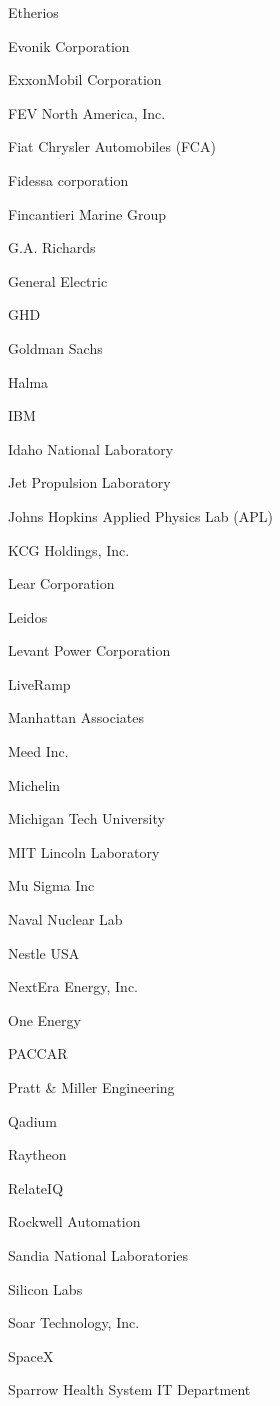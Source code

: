\documentclass[twoside]{article}
\begin{document}
\begin{center}
\begin{multicols}{5}
\begin{FlushLeft}
\begin{compactitem}
\item Etherios
\item Evonik Corporation
\item ExxonMobil Corporation
\item FEV North America, Inc.
\item Fiat Chrysler Automobiles (FCA)
\item Fidessa corporation
\item Fincantieri Marine Group
\item G.A. Richards
\item General Electric
\item GHD
\item Goldman Sachs
\item Halma
\item IBM
\item Idaho National Laboratory
\item Jet Propulsion Laboratory
\item Johns Hopkins Applied Physics Lab (APL)
\item KCG Holdings, Inc.
\item Lear Corporation
\item Leidos
\item Levant Power Corporation
\item LiveRamp
\item Manhattan Associates
\item Meed Inc.
\item Michelin
\item Michigan Tech University
\item MIT Lincoln Laboratory
\item Mu Sigma Inc
\item Naval Nuclear Lab
\item Nestle USA
\item NextEra Energy, Inc.
\item One Energy
\item PACCAR
\item Pratt \& Miller Engineering
\item Qadium
\item Raytheon
\item RelateIQ
\item Rockwell Automation
\item Sandia National Laboratories
\item Silicon Labs
\item Soar Technology, Inc.
\item SpaceX
\item Sparrow Health System IT Department

\end{compactitem}
\end{FlushLeft}
\end{multicols}
\end{center}
\end{document}
